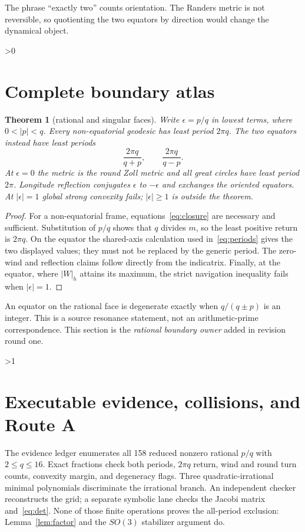 \documentclass[10pt]{article}
\providecommand{\CRevisionRound}{2}
\newtheorem{theorem}{Theorem}
\begin{document}
The phrase ``exactly two'' counts orientation.  The Randers metric is not
reversible, so quotienting the two equators by direction would change the
dynamical object.

\ifnum\CRevisionRound>0
\section{Complete boundary atlas}

\begin{theorem}[rational and singular faces]\label{thm:boundary}
Write $\epsilon=p/q$ in lowest terms, where $0<|p|<q$.  Every
non-equatorial geodesic has least period $2\pi q$.  The two equators instead
have least periods
\[
 \frac{2\pi q}{q+p},\qquad \frac{2\pi q}{q-p}.
\]
At $\epsilon=0$ the metric is the round Zoll metric and all great circles
have least period $2\pi$.  Longitude reflection conjugates $\epsilon$ to
$-\epsilon$ and exchanges the oriented equators.  At $|\epsilon|=1$ global
strong convexity fails; $|\epsilon|\ge1$ is outside the theorem.
\end{theorem}

\begin{proof}
For a non-equatorial frame, equations~\eqref{eq:closure} are necessary and
sufficient.  Substitution of $p/q$ shows that $q$ divides $m$, so the least
positive return is $2\pi q$.  On the equator the shared-axis calculation
used in~\eqref{eq:periods} gives the two displayed values; they must not be
replaced by the generic period.  The zero-wind and reflection claims follow
directly from the indicatrix.  Finally, at the equator, where $|W|_h$
attains its maximum, the strict navigation inequality fails when
$|\epsilon|=1$.
\end{proof}

An equator on the rational face is degenerate exactly when
$q/(q\pm p)$ is an integer.  This is a source resonance statement, not an
arithmetic-prime correspondence.  This section is the \emph{rational
boundary owner} added in revision round one.
\fi

\ifnum\CRevisionRound>1
\section{Executable evidence, collisions, and Route A}
The evidence ledger enumerates all 158 reduced nonzero rational $p/q$ with
$2\le q\le16$.  Exact fractions check both periods, $2\pi q$ return,
wind and round turn counts, convexity margin, and degeneracy flags.  Three
quadratic-irrational minimal polynomials discriminate the irrational branch.
An independent checker reconstructs the grid; a separate symbolic lane
checks the Jacobi matrix and~\eqref{eq:det}.  None of those finite operations
proves the all-period exclusion: Lemma~\ref{lem:factor} and the $SO(3)$
stabilizer argument do.
\end{document}
